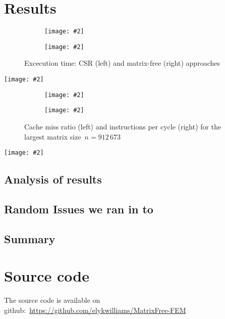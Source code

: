 \documentclass[12pt]{article}
\newcommand{\includegraphicsw}[2][1.]{\texttt{[image: \#2]}}
\begin{document}
\section{Results}
\begin{figure}[H]
	\centering
	\begin{subfigure}{.5\linewidth}
		\includegraphicsw{clTime.pdf}
	\end{subfigure}%
	\begin{subfigure}{.5\linewidth}
		\includegraphicsw{mfTime.pdf}
	\end{subfigure}%
	\caption{Excecution time: CSR (left) and matrix-free (right) approaches}\label{fig:time}
\end{figure}

\begin{table}[H]
	\centering\caption{Best thread team sizes (see Figure~\ref{fig:time})}
	\includegraphicsw[.9]{bestTime.pdf}
\end{table}

\begin{figure}[H]
	\centering
	\begin{subfigure}{.5\linewidth}
		\includegraphicsw{cache.pdf}
	\end{subfigure}%
	\begin{subfigure}{.5\linewidth}
		\includegraphicsw{inst.pdf}
	\end{subfigure}
	\caption{Cache miss ratio (left) and instructions per cycle (right) for the largest matrix size~$n = 912\,673$}
\end{figure}

\begin{table}[H]
	\centering\caption{Energy consumption for a single thread; TDP = 150\,W}
	\includegraphicsw[.9]{rapl.pdf}
\end{table}

\subsection{Analysis of results}

\subsection{Random Issues we ran in to}

\subsection{Summary}

\section{Source code}\label{sec:source}

The source code is available on github:~\url{https://github.com/elykwilliams/MatrixFree-FEM}







\end{document}
